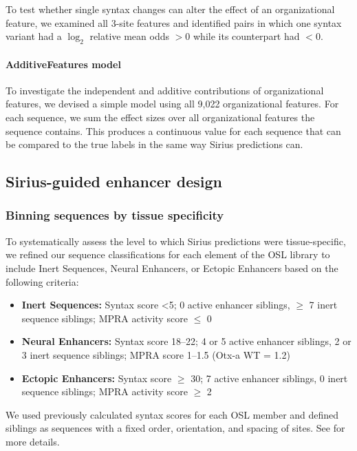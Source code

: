To test whether single syntax changes can alter the effect of an organizational feature, we examined all 3-site features and identified pairs in which one syntax variant had a $\log_2$ relative mean odds $> 0$ while its counterpart had $< 0$.

\paragraph{AdditiveFeatures model}

To investigate the independent and additive contributions of organizational features, we devised a simple model using all 9,022 organizational features. For each sequence, we sum the effect sizes over all organizational features the sequence contains. This produces a continuous value for each sequence that can be compared to the true labels in the same way Sirius predictions can.

\subsection{Sirius-guided enhancer design}

\subsubsection{Binning sequences by tissue specificity}

To systematically assess the level to which Sirius predictions were tissue-specific, we refined our sequence classifications for each element of the OSL library to include Inert Sequences, Neural Enhancers, or Ectopic Enhancers based on the following criteria:

\begin{itemize}
  \item \textbf{Inert Sequences:} Syntax score \textless 5; 0 active enhancer siblings, \(\geq\) 7 inert sequence siblings; MPRA activity score \(\leq\) 0
  \item \textbf{Neural Enhancers:} Syntax score 18--22; 4 or 5 active enhancer siblings, 2 or 3 inert sequence siblings; MPRA score 1--1.5 (Otx-a WT = 1.2)
  \item \textbf{Ectopic Enhancers:} Syntax score \(\geq\) 30; 7 active enhancer siblings, 0 inert sequence siblings; MPRA activity score \(\geq\) 2
\end{itemize}

We used previously calculated syntax scores for each OSL member and defined siblings as sequences with a fixed order, orientation, and spacing of sites. See \cite{Solvason2024-gi} for more details.

